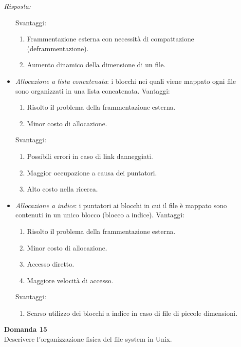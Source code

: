 \documentclass{article}
\newenvironment{problem}[2][Domanda]
    { \begin{mdframed}[backgroundcolor=gray!20] \textbf{#1 #2} \\}
    {  \end{mdframed}}
\newenvironment{solution}
    {\textit{Risposta:}}
    {}
\begin{document}
\begin{solution}
\begin{itemize}
\begin{enumerate}
    \end{enumerate}
    Svantaggi:
    \begin{enumerate}
        \item Frammentazione esterna con necessità di compattazione (deframmentazione).
        \item Aumento dinamico della dimensione di un file.
    \end{enumerate}
    \item \emph{Allocazione a lista concatenata}: i blocchi nei quali viene mappato ogni file sono organizzati in una lista concatenata.
    \newline
    \newline
  Vantaggi:
  \begin{enumerate}
      \item Risolto il problema della frammentazione esterna.
      \item Minor costo di allocazione.
  \end{enumerate}
  Svantaggi:
  \begin{enumerate}
      \item Possibili errori in caso di link danneggiati.
      \item Maggior occupazione a causa dei puntatori.
      \item Alto costo nella ricerca.
  \end{enumerate}
  \item \emph{Allocazione a indice}: i puntatori ai blocchi in cui il file è mappato sono contenuti in un unico blocco (blocco a indice).
  \newline
  \newline
  Vantaggi:
  \begin{enumerate}
      \item Risolto il problema della frammentazione esterna.
      \item Minor costo di allocazione.
      \item Accesso diretto.
      \item Maggiore velocità di accesso.
  \end{enumerate}
  Svantaggi:
  \begin{enumerate}
      \item Scarso utilizzo dei blocchi a indice in caso di file di piccole dimensioni.
  \end{enumerate}
\end{itemize} 
\end{solution}
\begin{problem}{15}
Descrivere l'organizzazione fisica del file system in Unix.
\end{problem}
\end{document}
